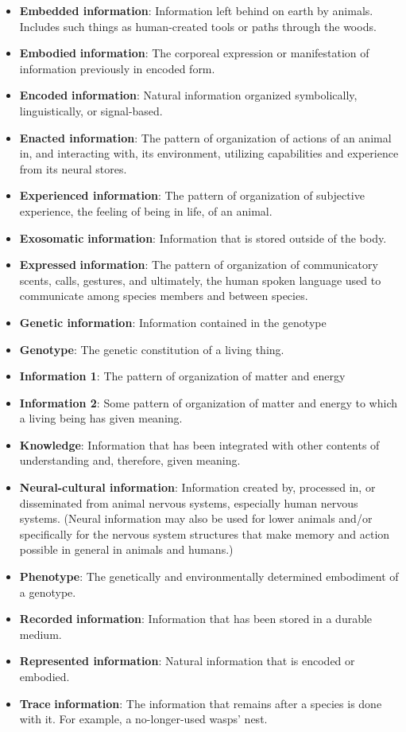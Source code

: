 \documentclass[
  letterpaper,
  DIV=11,
  numbers=noendperiod]{scrreprt}
\begin{document}
\begin{itemize}
\item
  \textbf{Embedded information}: Information left behind on earth by
  animals. Includes such things as human-created tools or paths through
  the woods.
\item
  \textbf{Embodied} \textbf{information}: The corporeal expression or
  manifestation of information previously in encoded form.
\item
  \textbf{Encoded} \textbf{information}: Natural information organized
  symbolically, linguistically, or signal-based.
\item
  \textbf{Enacted information}: The pattern of organization of actions
  of an animal in, and interacting with, its environment, utilizing
  capabilities and experience from its neural stores.
\item
  \textbf{Experienced information}: The pattern of organization of
  subjective experience, the feeling of being in life, of an animal.
\item
  \textbf{Exosomatic} \textbf{information}: Information that is stored
  outside of the body.
\item
  \textbf{Expressed} \textbf{information}: The pattern of organization
  of communicatory scents, calls, gestures, and ultimately, the human
  spoken language used to communicate among species members and between
  species.
\item
  \textbf{Genetic information}: Information contained in the genotype
\item
  \textbf{Genotype}: The genetic constitution of a living thing.
\item
  \textbf{Information 1}: The pattern of organization of matter and
  energy
\item
  \textbf{Information 2}: Some pattern of organization of matter and
  energy to which a living being has given meaning.
\item
  \textbf{Knowledge}: Information that has been integrated with other
  contents of understanding and, therefore, given meaning.
\item
  \textbf{Neural-cultural information}: Information created by,
  processed in, or disseminated from animal nervous systems, especially
  human nervous systems. (Neural information may also be used for lower
  animals and/or specifically for the nervous system structures that
  make memory and action possible in general in animals and humans.)
\item
  \textbf{Phenotype}: The genetically and environmentally determined
  embodiment of a genotype.
\item
  \textbf{Recorded} \textbf{information}: Information that has been
  stored in a durable medium.
\item
  \textbf{Represented information}: Natural information that is encoded
  or embodied.
\item
  \textbf{Trace} \textbf{information}: The information that remains
  after a species is done with it. For example, a no-longer-used wasps'
  nest.
\end{itemize}
\end{document}
